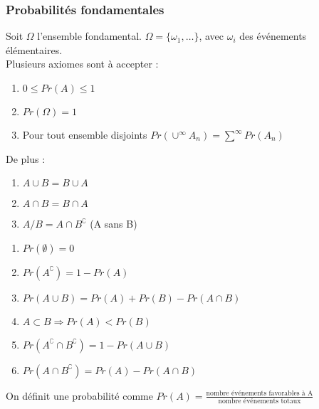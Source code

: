 \documentclass[../main.tex]{subfiles}
\begin{document}
\subsubsection{Probabilités fondamentales}
Soit $\Omega$ l'ensemble fondamental. $\Omega = \{\omega_1, \dots\}$, avec $\omega_i$ des événements élémentaires.\\

Plusieurs axiomes sont à accepter :\\
\begin{enumerate}
    \item $0 \leq Pr(A) \leq 1$\\
    \item $Pr(\Omega) = 1$\\
    \item Pour tout ensemble disjoints $Pr(\cup^{\infty} A_n) = \sum^{\infty} Pr(A_n)$\\
\end{enumerate}

De plus : \\
\begin{enumerate}
    \item $A\cup B = B\cup A$\\
    \item $A\cap B = B\cap A$\\
    \item $A/B = A\cap B^\complement$ (A sans B)\\
\end{enumerate}

\begin{enumerate}
    \item $Pr(\emptyset) = 0$\\
    \item $Pr(A^\complement) = 1-Pr(A)$\\
    \item $Pr(A\cup B) = Pr(A)+Pr(B) - Pr(A\cap B)$\\
    \item $A\subset B \Rightarrow Pr(A)<Pr(B)$\\
    \item $Pr(A^\complement \cap B^\complement) = 1-Pr(A\cup B)$\\
    \item $Pr(A\cap B^\complement) = Pr(A)-Pr(A\cap B)$\\
\end{enumerate}

On définit une probabilité comme $Pr(A) = \frac{\textrm{nombre événements favorables à A}}{\textrm{nombre événements totaux}}$\\
\end{document}
